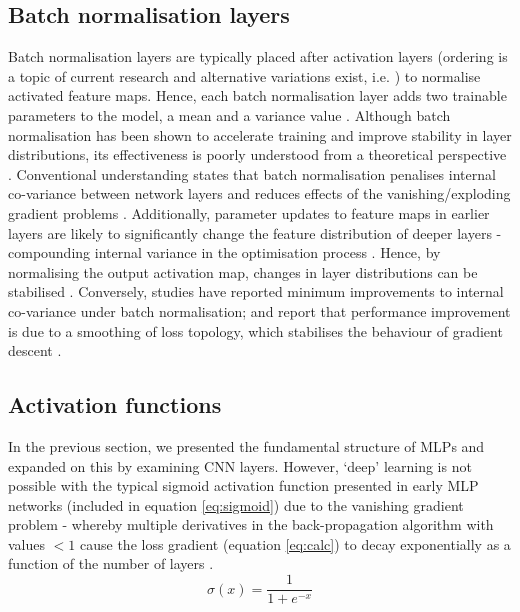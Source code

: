 \subsection{Batch normalisation layers}
Batch normalisation layers are typically placed after activation layers (ordering is a topic of current research and alternative variations exist, i.e. \cite{Kazemifar_2018}) to normalise activated feature maps. Hence, each batch normalisation layer adds two trainable parameters to the model, a mean and a variance value \cite{Lundervold2019}. Although batch normalisation has been shown to accelerate training and improve stability in layer distributions, its effectiveness is poorly understood from a theoretical perspective \cite{santurkar2018}. Conventional understanding states that batch normalisation penalises internal co-variance between network layers \cite{ioffe2015} and reduces effects of the vanishing/exploding gradient problems \cite{Li2014}. Additionally, parameter updates to feature maps in earlier layers are likely to significantly change the feature distribution of deeper layers - compounding internal variance in the optimisation process \cite{santurkar2018}. Hence, by normalising the output activation map, changes in layer distributions can be stabilised \cite{santurkar2018}. Conversely, studies have reported minimum improvements to internal co-variance under batch normalisation; and report that performance improvement is due to a smoothing of loss topology, which stabilises the behaviour of gradient descent \cite{santurkar2018}.

\subsection{Activation functions}
\label{sec:act}
In the previous section, we presented the fundamental structure of MLPs and expanded on this by examining CNN layers. However, `deep' learning is not possible with the typical sigmoid activation function presented in early MLP networks \cite{Lundervold2019} (included in equation \ref{eq:sigmoid}) due to the vanishing gradient problem - whereby multiple derivatives in the back-propagation algorithm with values $<1$ cause the loss gradient (equation \ref{eq:calc}) to decay exponentially as a function of the number of layers \cite{Lundervold2019}. 
\begin{equation}
\sigma(x) = \frac{1}{1+e^{-x}}
\label{eq:sigmoid}
\end{equation}

